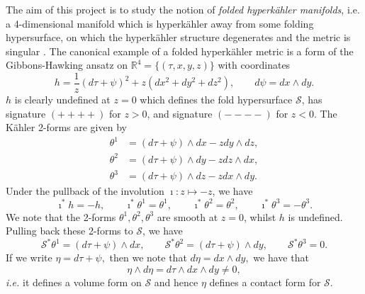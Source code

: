 \documentclass[a4paper,onecolumn,12pt]{article}
\theoremstyle{definition}
\theoremstyle{remark}
\newcommand{\ie}{\emph{i.e.} }
\begin{document}
The aim of this project is to study the notion of \emph{folded hyperk{\"a}hler manifolds}, i.e. a 4-dimensional manifold which is hyperk{\"a}hler away from some folding hypersurface, on which the hyperk{\"a}hler structure degenerates and the metric is singular \cite{hitchin_2015,biquard_2015}. The canonical example of a folded hyperk{\"a}hler metric is a form of the Gibbons-Hawking ansatz on $\mathbb{R}^{4} = \{(\tau, x, y, z)\}$ with coordinates \cite{evanescent_2016}
\begin{equation}
\label{fold_gh_metric}
	h = \frac{1}{z}(d\tau + \psi)^2 + z(dx^{2} + dy^{2} + dz^{2}),\qquad d\psi = dx\wedge dy.
\end{equation}
$h$ is clearly undefined at $z=0$ which defines the fold hypersurface $\mathcal{S}$, has signature $(++++)$ for $z>0$, and signature $(----)$ for $z<0$. The K{\"a}hler 2-forms are given by 
\begin{subequations}
	\begin{align} 
	\theta^{1} &= (d\tau + \psi)\wedge dx - z dy\wedge dz, \\ 
	\theta^{2} &= (d\tau + \psi)\wedge dy - z dz\wedge dx, \\
	\theta^{3} &= (d\tau + \psi)\wedge dz - z dx\wedge dy.
	\end{align}
\end{subequations}
Under the pullback of the involution $\imath:z \mapsto -z$, we have
\begin{equation}
\label{parity}
\imath^{*}h = -h,\qquad \imath^{*}\theta^{1} = \theta^{1},\qquad \imath^{*}\theta^{2} = \theta^{2},\qquad \imath^{*}\theta^{3} = -\theta^{3}.
\end{equation}
We note that the 2-forms $\theta^{1}, \theta^{2}, \theta^{3}$ are smooth at $z=0$, whilst $h$ is undefined. Pulling back these 2-forms to $\mathcal{S}$, we have
\begin{equation}
\mathcal{S}^{*}\theta^{1} = (d\tau+\psi)\wedge dx,\qquad \mathcal{S}^{*}\theta^{2} = (d\tau+\psi)\wedge dy,\qquad
\mathcal{S}^{*}\theta^{3} = 0.
\end{equation}
If we write $\eta = d\tau +\psi,$ then  we note that $d\eta = dx\wedge dy,$ we have that
\begin{equation}
	\eta \wedge d\eta = d\tau \wedge dx\wedge dy \neq 0,
\end{equation}
\ie it defines a volume form on $\mathcal{S}$ and hence $\eta$ defines a contact form for $\mathcal{S}.$\\
\end{document}
